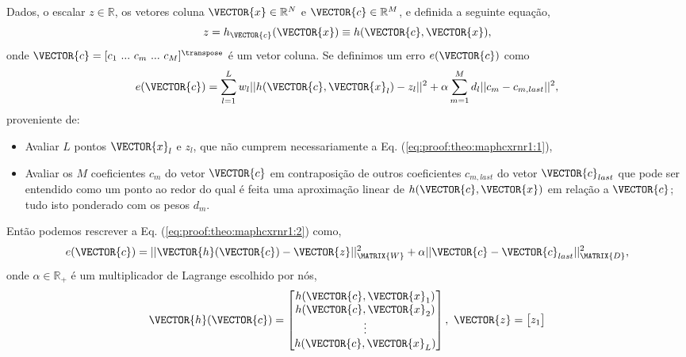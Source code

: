 \begin{myproofT}\label{proof:theo:maphcxrnr1}
Dados,
o escalar $z \in \mathbb{R}$, os vetores coluna $\VECTOR{x} \in \mathbb{R}^N$ e $\VECTOR{c} \in \mathbb{R}^M$, e 
definida a seguinte equação,
\begin{equation}\label{eq:proof:theo:maphcxrnr1:1}
z=h_{\VECTOR{c}}(\VECTOR{x})\equiv h(\VECTOR{c},\VECTOR{x}),
\end{equation}
onde $\VECTOR{c}=[c_1~ ...~ c_m~ ...~ c_M]^{\transpose}$ é um vetor coluna.
Se definimos um erro $e(\VECTOR{c})$ como
\begin{equation}\label{eq:proof:theo:maphcxrnr1:2}
e(\VECTOR{c}) =  \sum_{l=1}^{L} w_l||h(\VECTOR{c},\VECTOR{x}_l)-z_l||^2 + \alpha \sum_{m=1}^{M} d_l||c_m-c_{m,last}||^2,
\end{equation}
proveniente de:
\begin{itemize}
\item Avaliar $L$ pontos $\VECTOR{x}_l$ e $z_l$, que não cumprem necessariamente a Eq. (\ref{eq:proof:theo:maphcxrnr1:1}), 
\item Avaliar os $M$ coeficientes $c_m$ do vetor $\VECTOR{c}$ 
em contraposição de outros coeficientes $c_{m,last}$ do vetor $\VECTOR{c}_{last}$
que pode ser entendido como um ponto ao redor do qual é feita uma aproximação
linear de $h(\VECTOR{c},\VECTOR{x})$ em relação a $\VECTOR{c}$; 
tudo isto ponderado com os pesos $d_m$.
\end{itemize}
Então podemos rescrever a Eq. (\ref{eq:proof:theo:maphcxrnr1:2}) como,
\begin{equation}\label{eq:proof:theo:maphcxrnr1:3}
e(\VECTOR{c}) =  ||\VECTOR{h}(\VECTOR{c})-\VECTOR{z}||_{\MATRIX{W}}^2 + \alpha||\VECTOR{c}-\VECTOR{c}_{last}||_{\MATRIX{D}}^2,
\end{equation}
onde $\alpha \in \mathbb{R}_+$ é um multiplicador de Lagrange escolhido por nós,
\begin{equation}
\VECTOR{h}(\VECTOR{c})=\begin{bmatrix}
h(\VECTOR{c},\VECTOR{x}_1)\\ 
h(\VECTOR{c},\VECTOR{x}_2)\\ 
\vdots\\ 
h(\VECTOR{c},\VECTOR{x}_L)
\end{bmatrix},
~
\VECTOR{z}=\begin{bmatrix}
z_1\\ 

\end{bmatrix}
\end{equation}
\end{myproofT}
